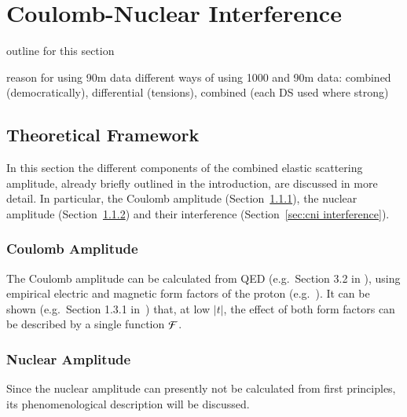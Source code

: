 \newpage

\section{Coulomb-Nuclear Interference}
\label{sec:coulomb}

\> outline for this section

\> reason for using 90m data
\> different ways of using 1000 and 90m data: combined (democratically), differential (tensions), combined (each DS used where strong)


\subsection{Theoretical Framework}
\label{sec:cni framework}

In this section the different components of the combined elastic scattering amplitude, already briefly outlined in the introduction, are discussed in more detail. In particular, the Coulomb amplitude (Section~\ref{sec:cni coulomb}), the nuclear amplitude (Section~\ref{sec:cni nuclear}) and their interference (Section~\ref{sec:cni interference}).

\subsubsection{Coulomb Amplitude}
\label{sec:cni coulomb}
%
The Coulomb amplitude can be calculated from QED (e.g.~Section 3.2 in \cite{block06}), using empirical electric and magnetic form factors of the proton (e.g.~\cite{puckett10}). It can be shown (e.g.~Section 1.3.1 in~\cite{jan_thesis}) that, at low $|t|$, the effect of both form factors can be described by a single function ${\cal F}$. 



\subsubsection{Nuclear Amplitude}
\label{sec:cni nuclear}
%
Since the nuclear amplitude can presently not be calculated from first principles, its phenomenological description will be discussed.

